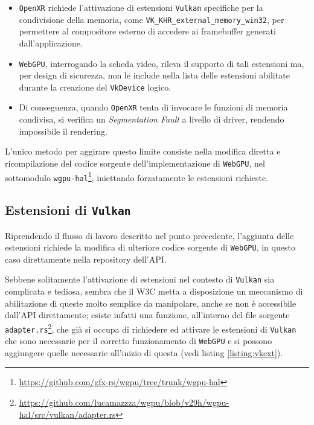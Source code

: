 \documentclass[a4paper, 11pt, twoside]{report}
\begin{document}
\begin{itemize}
    \item \texttt{\gls{OpenXR}} richiede l'attivazione di estensioni \texttt{\gls{Vulkan}} specifiche per la
        condivisione della memoria, come \texttt{VK\_KHR\_external\_memory\_win32}, per permettere al compositore
        esterno di accedere ai framebuffer generati dall'applicazione.
    \item \texttt{WebGPU}, interrogando la scheda video, rileva il supporto di tali estensioni ma, per design
        di sicurezza, non le include nella lista delle estensioni abilitate durante la creazione del \texttt{VkDevice}
        logico.
    \item Di conseguenza, quando \texttt{\gls{OpenXR}} tenta di invocare le funzioni di memoria condivisa, si verifica
        un \textit{Segmentation Fault} a livello di driver, rendendo impossibile il rendering.
\end{itemize}

L'unico metodo per aggirare questo limite consiste nella modifica diretta e ricompilazione del codice sorgente
dell'implementazione di \texttt{WebGPU}, nel sottomodulo
\texttt{wgpu-hal}\footnote{\url{https://github.com/gfx-rs/wgpu/tree/trunk/wgpu-hal}}, iniettando forzatamente le
estensioni richieste.

\subsection{Estensioni di \texttt{\gls{Vulkan}}}

Riprendendo il flusso di lavoro descritto nel punto precedente, l'aggiunta delle estensioni richiede la modifica di
ulteriore codice sorgente di \texttt{WebGPU}, in questo caso direttamente nella repository dell'API.

Sebbene solitamente l'attivazione di estensioni nel contesto di \texttt{\gls{Vulkan}} sia complicata e tediosa, sembra
che il W3C metta a disposizione un meccanismo di abilitazione di queste molto semplice da manipolare, anche se non è
accessibile dall'API direttamente; esiste infatti una funzione, all'interno del file sorgente
\texttt{adapter.rs}\footnote{\url{https://github.com/lucamazzza/wgpu/blob/v29h/wgpu-hal/src/vulkan/adapter.rs}}, che
già si occupa di richiedere ed attivare le estensioni di \texttt{\gls{Vulkan}} che sono necessarie per il corretto
funzionamento di \texttt{WebGPU} e si possono aggiungere quelle necessarie all'inizio di questa (vedi listing
\ref{listing:vkext}).
\end{document}
